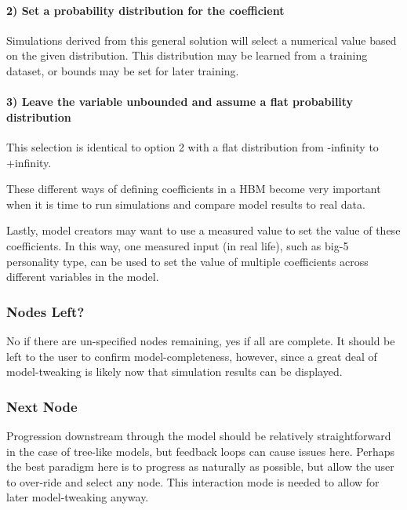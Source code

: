 \documentclass[conference]{IEEEtran}
\begin{document}
\paragraph{2) Set a probability distribution for the coefficient}
Simulations derived from this general solution will select a numerical value based on the given distribution. 
This distribution may be learned from a training dataset, or bounds may be set for later training. 

\paragraph{3) Leave the variable unbounded and assume a flat probability distribution}
This selection is identical to option 2 with a flat distribution from -infinity to +infinity.


These different ways of defining coefficients in a HBM become very important when it is time to run simulations and compare model results to real data. 

Lastly, model creators may want to use a measured value to set the value of these coefficients. In this way, one measured input (in real life), such as big-5 personality type, can be used to set the value of multiple coefficients across different variables in the model.


\subsubsection{Nodes Left?}
No if there are un-specified nodes remaining, yes if all are complete. 
It should be left to the user to confirm model-completeness, however, since a great deal of model-tweaking is likely now that simulation results can be displayed.

\subsubsection{Next Node}
Progression downstream through the model should be relatively straightforward in the case of tree-like models, but feedback loops can cause issues here. 
Perhaps the best paradigm here is to progress as naturally as possible, but allow the user to over-ride and select any node. 
This interaction mode is needed to allow for later model-tweaking anyway. 
\end{document}
